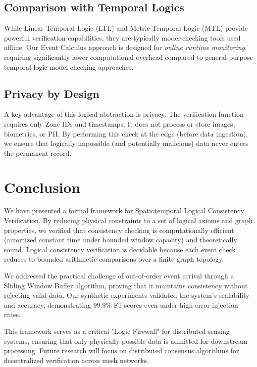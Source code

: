 \documentclass[conference]{IEEEtran}
\begin{document}
\subsection{Comparison with Temporal Logics}
While Linear Temporal Logic (LTL) and Metric Temporal Logic (MTL) provide powerful verification capabilities, they are typically model-checking tools used offline. Our Event Calculus approach is designed for \textit{online runtime monitoring}, requiring significantly lower computational overhead compared to general-purpose temporal logic model checking approaches.

\subsection{Privacy by Design}
A key advantage of this logical abstraction is privacy. The verification function requires only Zone IDs and timestamps. It does not process or store images, biometrics, or PII. By performing this check at the edge (before data ingestion), we ensure that logically impossible (and potentially malicious) data never enters the permanent record.

\section{Conclusion}
We have presented a formal framework for Spatiotemporal Logical Consistency Verification. By reducing physical constraints to a set of logical axioms and graph properties, we verified that consistency checking is computationally efficient (amortized constant time under bounded window capacity) and theoretically sound. Logical consistency verification is decidable because each event check reduces to bounded arithmetic comparisons over a finite graph topology.

We addressed the practical challenge of out-of-order event arrival through a Sliding Window Buffer algorithm, proving that it maintains consistency without rejecting valid data. Our synthetic experiments validated the system's scalability and accuracy, demonstrating 99.9\% F1-scores even under high error injection rates.

This framework serves as a critical "Logic Firewall" for distributed sensing systems, ensuring that only physically possible data is admitted for downstream processing. Future research will focus on distributed consensus algorithms for decentralized verification across mesh networks.
\end{document}
